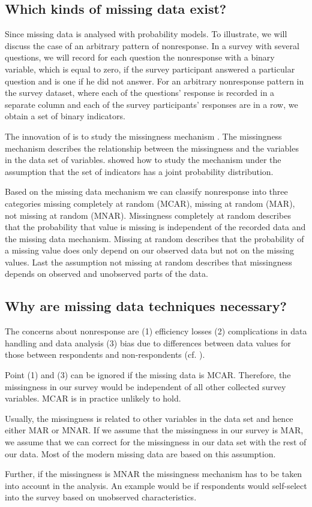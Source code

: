 \subsection{Which kinds of missing data exist?} 
Since \cite{rubin1976} missing data is analysed with probability models. 
To illustrate, we will discuss the case of an arbitrary pattern of nonresponse.
In a survey with several questions, we will record for each question the nonresponse with a binary variable, which is equal to zero, if the survey participant answered a particular question and is one if he did not answer. 
For an arbitrary nonresponse pattern in the survey dataset, where each of the questions' response is recorded in a separate column and each of the survey participants' responses are in a row, we obtain a set of binary indicators. \par 
The innovation of \cite{rubin1976} is to study the missingness mechanism \cite{Little}. The missingness mechanism describes the relationship between the missingness and the variables in the data set of variables. \cite{rubin1976} showed how to study the mechanism under the assumption that the set of indicators has a joint probability distribution. \par
Based on the missing data mechanism we can classify nonresponse into three categories missing completely at random (MCAR), missing at random (MAR), not missing at random (MNAR). Missingness completely at random describes that the probability that value is missing is independent of the recorded data and the missing data mechanism. 
Missing at random describes that the probability of a missing value does only depend on our observed data but not on the missing values. 
Last the assumption not missing at random describes that missingness depends on observed and unobserved parts of the data. \par

\subsection{Why are missing data techniques necessary?}

The concerns about nonresponse are (1) efficiency losses (2) complications in data handling and data analysis (3) bias due to differences between data values for those between respondents and non-respondents  (cf. \cite{Schafer99}). \par 
Point (1) and (3)  can be ignored if the missing data is MCAR. 
Therefore, the missingness in our survey would be independent of all other collected survey variables. MCAR is in practice unlikely to hold. \par 
Usually, the missingness is related to other variables in the data set and hence either MAR or MNAR. 
If we assume that the missingness in our survey is  MAR, we assume that we can correct for the missingness in our data set with the rest of our data. Most of the modern missing data are based on this assumption. \par
Further, if the missingness is MNAR the missingness mechanism has to be taken into account in the analysis. An example would be if respondents would self-select into the survey based on unobserved characteristics.


